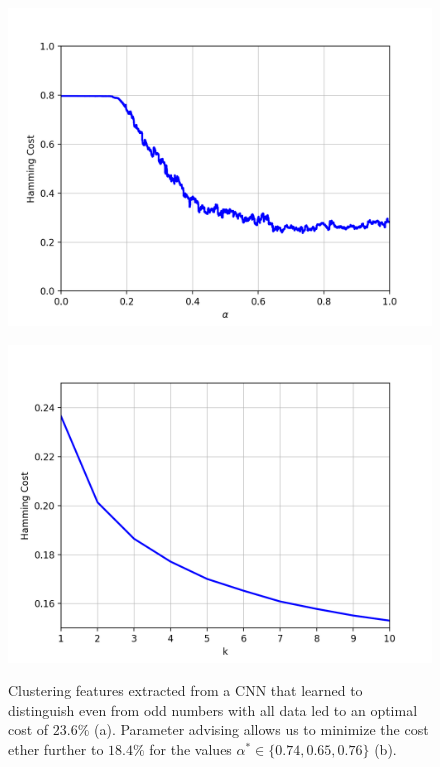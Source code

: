 \begin{figure}[H]
\centering
\begin{minipage}{.45\textwidth}
  \centering
  {\includegraphics[width=\linewidth]{plots/mnist-cnn-even-odd-sc}}
\end{minipage}\quad
\begin{minipage}{.45\textwidth}
  \centering
  {\includegraphics[width=\linewidth]{plots/mnist-cnn-even-odd-sc-top10}}
\end{minipage}
\caption{%
  Clustering features extracted from a CNN that learned to distinguish even from odd numbers with all data led to an optimal cost of $23.6\%$ (a). Parameter advising allows us to minimize the cost ether further to $18.4\%$ for the values $\alpha^* \in \{0.74, 0.65, 0.76\}$ (b).}
\label{fig:mnist_cnn_even_odd}
\end{figure}

